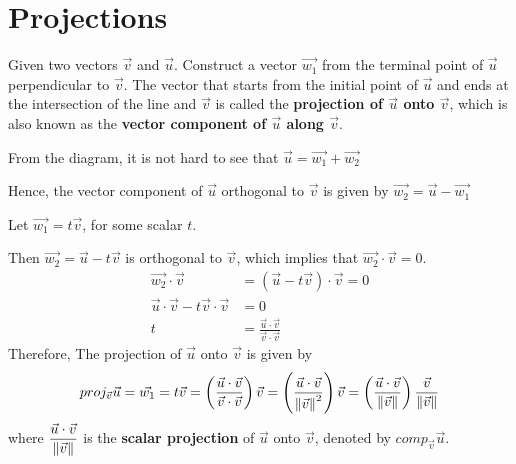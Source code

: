\chapter{Projections}

Given two vectors $\vec{v}$ and $\vec{u}$. Construct a vector $\vec{w_1}$ from the terminal
point of $\vec{u}$ perpendicular to $\vec{v}$. The vector that starts from the
initial point of $\vec{u}$ and ends at the intersection of the line and
$\vec{v}$ is called the \textbf{projection of $\vec{u}$ onto $\vec{v}$}, which
is also known as the \textbf{vector component of $\vec{u}$ along $\vec{v}$}.

\begin{center}
\end{center}

\noindent From the diagram, it is not hard to see that $\vec{u} = \vec{w_1} + \vec{w_2}$

\noindent Hence, the vector component of $\vec{u}$ orthogonal to $\vec{v}$ is given by $\vec{w_2} = \vec{u} - \vec{w_1}$

\noindent Let $\vec{w_1} = t\vec{v}$, for some scalar $t$.

\noindent Then $\vec{w_2} = \vec{u} - t\vec{v}$ is orthogonal to $\vec{v}$, which implies that $\vec{w_2} \cdot \vec{v} = 0$.
\begin{align*}
    \vec{w_2} \cdot \vec{v}                        & = (\vec{u} - t\vec{v}) \cdot \vec{v} = 0              \\
    \vec{u} \cdot \vec{v} - t\vec{v} \cdot \vec{v} & = 0                                                   \\
    t                                              & = \frac{\vec{u} \cdot \vec{v}}{\vec{v} \cdot \vec{v}}
\end{align*}
Therefore, The projection of $\vec{u}$ onto $\vec{v}$ is given by \[proj_{\vec{v}}\vec{u} = \vec{w_1} = t\vec{v} = \left(\dfrac{\vec{u} \cdot \vec{v}}{\vec{v} \cdot \vec{v}}\right)\vec{v} = \left(\frac{\vec{u} \cdot \vec{v}}{\left\lVert\vec{v}\right\rVert^2}\right)\vec{v} = \left(\frac{\vec{u} \cdot \vec{v}}{\left\lVert\vec{v}\right\rVert}\right)\dfrac{\vec{v}}{\left\lVert\vec{v}\right\rVert}\] where $\dfrac{\vec{u} \cdot \vec{v}}{\left\lVert\vec{v}\right\rVert}$ is the \textbf{scalar projection} of $\vec{u}$ onto $\vec{v}$, denoted by $comp_{\vec{v}}\vec{u}$.

